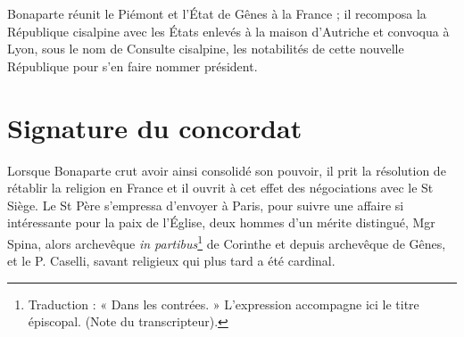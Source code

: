 Bonaparte réunit le Piémont et l'État de Gênes à la France ; il recomposa la République cisalpine avec les États enlevés à la maison d'Autriche et convoqua à Lyon, sous le nom de Consulte cisalpine, les notabilités de cette nouvelle
République pour s'en faire nommer président.

\section*{Signature du concordat}
Lorsque Bonaparte crut avoir ainsi consolidé son pouvoir, il prit la résolution de rétablir la religion en France et il ouvrit à cet effet des négociations avec le St Siège. Le St Père s'empressa d'envoyer à Paris, pour suivre une affaire si intéressante pour la paix de l'Église, deux hommes d'un mérite distingué, Mgr Spina, alors archevêque \textit{in partibus}\footnote{Traduction : « Dans les contrées. » L’expression accompagne ici le titre épiscopal. (Note du transcripteur).} de Corinthe et depuis archevêque de Gênes, et le P. Caselli, savant religieux qui plus tard a été cardinal.

